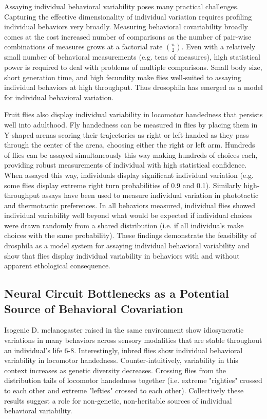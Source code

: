 \documentclass[12pt,letterpaper]{article}
\begin{document}
Assaying individual behavioral variability poses many practical challenges. Capturing the effective dimensionality of individual variation requires profiling individual behaviors very broadly. Measuring behavioral covariability broadly comes at the cost increased number of comparisons as the number of pair-wise combinations of measures grows at a factorial rate ${n \choose 2}$. Even with a relatively small number of behavioral measurements (e.g. tens of measures), high statistical power is required to deal with problems of multiple comparisons. Small body size, short generation time, and high fecundity make flies well-suited to assaying individual behaviors at high throughput. Thus drosophila has emerged as a model for individual behavioral variation. 

Fruit flies also display individual variability in locomotor handedness that persists well into adulthood. Fly handedness can be measured in flies by placing them in Y-shaped arenas scoring their trajectories as right or left-handed as they pass through the center of the arena, choosing either the right or left arm. Hundreds of flies can be assayed simultaneously this way making hundreds of choices each, providing robust measurements of individual with high statistical confidence. When assayed this way, individuals display significant individual variation (e.g. some flies display extreme right turn probabilities of 0.9 and 0.1). Similarly high-throughput assays have been used to measure individual variation in phototactic and thermotactic preferences. In all behaviors measured, individual flies showed individual variability well beyond what would be expected if individual choices were drawn randomly from a shared distribution (i.e. if all individuals make choices with the same probability). These findings demonstrate the feasibility of drosphila as a model system for assaying individual behavioral variability and show that flies display individual variability in behaviors with and without apparent ethological consequence. 

\subsection{Neural Circuit Bottlenecks as a Potential Source of Behavioral Covariation}

Isogenic D. melanogaster raised in the same environment show idiosyncratic variations in many
behaviors across sensory modalities that are stable throughout an individual’s life 6-8. Interestingly, inbred flies show individual behavioral variability in locomotor handedness. Counter-intuitively, variability in this context increases as genetic diversity decreases. Crossing flies from the distribution tails of locomotor handedness together (i.e. extreme "righties" crossed to each other and extreme "lefties" crossed to each other). Collectively these results suggest a role for non-genetic, non-heritable sources of individual behavioral variability.
\end{document}
